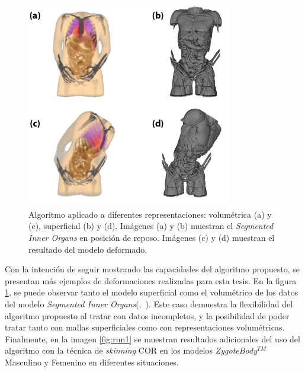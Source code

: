 \begin{figure}[!ht]%
   \centering
   \includegraphics[width=0.8\textwidth]{IMG/HV}
    \caption{Algoritmo aplicado a diferentes representaciones: volumétrica (a) y (c), superficial (b) y (d). Imágenes (a) y (b) muestran el \emph{Segmented Inner Organs} en posición de reposo. Imágenes (c) y (d) muestran el resultado del modelo deformado.}
    \label{fig:humanvisible}
\end{figure}

Con la intención de seguir mostrando las capacidades del algoritmo propuesto, se presentan más ejemplos de deformaciones realizadas para esta tesis. En la figura \ref{fig:humanvisible}, se puede observar tanto el modelo superficial como el volumétrico de los datos del modelo \emph{Segmented Inner Organs}(\cite{VM2002},~\cite{VoxelMan}). Este caso demuestra la flexibilidad del algoritmo propuesto al tratar con datos incompletos, y la posibilidad de poder tratar tanto con mallas superficiales como con representaciones volumétricas.
%
Finalmente, en la imagen \ref{fig:run1} se muestran resultados adicionales del uso del algoritmo con la técnica de \emph{skinning} \ac{COR} en los modelos \emph{ZygoteBody}$^{TM}$ Masculino y Femenino en diferentes situaciones.

